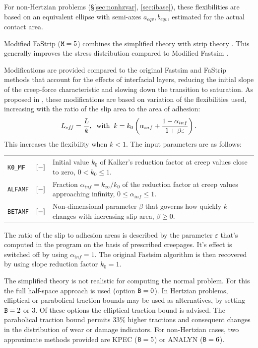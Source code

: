 \documentclass[12pt]{report}
\newenvironment{inputvars}{\vspace{0.4\baselineskip}%

\begin{tabular}{>{\raggedright}p{22mm}p{19mm}p{113mm}}}{
\end{tabular}

}
\newcommand{\inpvar}[3]{{\small\tt #1} & $#2$ & #3 \\[1ex]}
\begin{document}
For non-Hertzian problems (\S \ref{sec:nonhzvar}, \ref{sec:ibase}), these
flexibilities are based on an equivalent ellipse with semi-axes $a_{eqv},
b_{eqv}$, estimated for the actual contact area.

Modified FaStrip (${\tt M}=5$) combines the simplified theory with strip
theory \cite{Kalker1966a-strip,Sichani2016b-fastrip}. This generally
improves the stress distribution compared to Modified Fastsim
\cite{Vollebregt2025a-indicators}.

Modifications are provided compared to the original Fastsim and FaStrip
methods that account for the effects of interfacial layers, reducing the
initial slope of the creep-force characteristic and slowing down the
transition to saturation. As proposed in \cite{Spiryagin2013}, these
modifications are based on variation of the flexibilities used,
increasing with the ratio of the slip area to the area of adhesion:
\begin{equation}\label{eq:k_modif_fs}
   L_{ef\!f} = \frac{L}{k}, \;\;\mbox{with}\;\;
   k = k_0 \left( \alpha_{inf} + 
                \frac{1-\alpha_{inf}}{1+\beta\varepsilon} \right) .
\end{equation}
This increases the flexibility when $k<1$. The input parameters are as
follows:
\begin{inputvars}
\inpvar{K0\_MF}{\bunit{-}}{Initial value $k_0$ of Kalker's reduction factor
        at creep values close to zero, $0<k_0\le 1$.}
\inpvar{ALFAMF}{\bunit{-}}{Fraction $\alpha_{inf}=k_\infty/k_0$ of the reduction
        factor at creep values approaching infinity, $0\le\alpha_{inf}\le 1$.}
\inpvar{BETAMF}{\bunit{-}}{Non-dimensional parameter $\beta$ that governs how
        quickly $k$ changes with increasing slip area, $\beta\ge 0$.}
\end{inputvars}
The ratio of the slip to adhesion areas is described by the parameter
$\varepsilon$ that's computed in the program on the basis of prescribed
creepages. It's effect is switched off by using $\alpha_{inf}=1$.
The original Fastsim algorithm is then recovered by using slope reduction
factor $k_0=1$.

The simplified theory is not realistic for computing the normal problem.
For this the full half-space approach is used (option ${\tt B}=0$). In
Hertzian problems, elliptical or parabolical traction bounds may be
used as alternatives, by setting ${\tt B}=2$ or 3. Of these options the
elliptical traction bound is advised. The parabolical traction bound
permits $33\%$ higher tractions and consequent changes in the distribution
of wear or damage indicators. For non-Hertzian cases, two approximate
methods provided are KPEC (${\tt B}=5$) or ANALYN (${\tt B}=6$).
\end{document}
